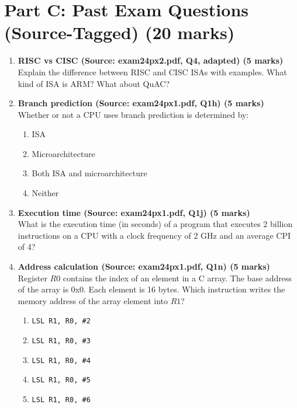 \documentclass[11pt]{article}
\begin{document}
\section*{Part C: Past Exam Questions (Source-Tagged) (20 marks)}
\begin{enumerate}[label=\textbf{C\arabic*.}]
  \item \textbf{RISC vs CISC (Source: exam24px2.pdf, Q4, adapted) (5 marks)}\\
  Explain the difference between RISC and CISC ISAs with examples. What kind of ISA is ARM? What about QuAC?

  \item \textbf{Branch prediction (Source: exam24px1.pdf, Q1h) (5 marks)}\\
  Whether or not a CPU uses branch prediction is determined by:
  \begin{enumerate}[label=(\Alph*)]
    \item ISA
    \item Microarchitecture
    \item Both ISA and microarchitecture
    \item Neither
  \end{enumerate}

  \item \textbf{Execution time (Source: exam24px1.pdf, Q1j) (5 marks)}\\
  What is the execution time (in seconds) of a program that executes 2 billion instructions on a CPU with a clock frequency of 2 GHz and an average CPI of 4?

  \item \textbf{Address calculation (Source: exam24px1.pdf, Q1n) (5 marks)}\\
  Register $R0$ contains the index of an element in a C array. The base address of the array is 0x0. Each element is 16 bytes.
  Which instruction writes the memory address of the array element into $R1$?
  \begin{enumerate}[label=(\Alph*)]
    \item \texttt{LSL R1, R0, \#2}
    \item \texttt{LSL R1, R0, \#3}
    \item \texttt{LSL R1, R0, \#4}
    \item \texttt{LSL R1, R0, \#5}
    \item \texttt{LSL R1, R0, \#6}
  \end{enumerate}
\end{enumerate}
\end{document}
